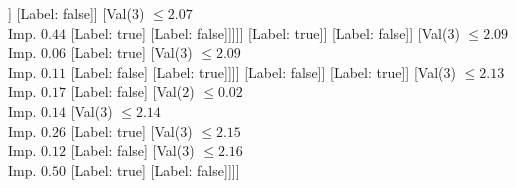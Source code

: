 \documentclass[margin=10pt]{standalone}
\begin{document}
\begin{forest}
										[Val($3$) $ \leq 2.16$ \\ Imp. $0.04$
											[Val($3$) $ \leq 2.16$ \\ Imp. $0.02$
												[Val($3$) $ \leq 2.11$ \\ Imp. $0.02$
													[Val($3$) $ \leq 2.10$ \\ Imp. $0.06$
														[Val($3$) $ \leq 2.09$ \\ Imp. $0.07$
															[Val($3$) $ \leq 2.09$ \\ Imp. $0.05$
																[Val($3$) $ \leq 2.07$ \\ Imp. $0.14$
																	[Val($3$) $ \leq 2.07$ \\ Imp. $0.09$
																		[Val($3$) $ \leq 2.03$ \\ Imp. $0.06$
																			[Label: false]
																			[Val($3$) $ \leq 2.04$ \\ Imp. $0.11$
																				[Label: true]
																				[Val($3$) $ \leq 2.06$ \\ Imp. $0.09$
																					[Val($3$) $ \leq 2.04$ \\ Imp. $0.12$
																						[Val($3$) $ \leq 2.04$ \\ Imp. $0.50$
																							[Label: false]
																							[Label: true]]
																						[Label: false]]
																					[Val($3$) $ \leq 2.07$ \\ Imp. $0.44$
																						[Label: true]
																						[Label: false]]]]]
																		[Label: true]]
																	[Label: false]]
																[Val($3$) $ \leq 2.09$ \\ Imp. $0.06$
																	[Label: true]
																	[Val($3$) $ \leq 2.09$ \\ Imp. $0.11$
																		[Label: false]
																		[Label: true]]]]
															[Label: false]]
														[Label: true]]
													[Val($3$) $ \leq 2.13$ \\ Imp. $0.17$
														[Label: false]
														[Val($2$) $ \leq 0.02$ \\ Imp. $0.14$
															[Val($3$) $ \leq 2.14$ \\ Imp. $0.26$
																[Label: true]
																[Val($3$) $ \leq 2.15$ \\ Imp. $0.12$
																	[Label: false]
																	[Val($3$) $ \leq 2.16$ \\ Imp. $0.50$
																		[Label: true]
																		[Label: false]]]]

\end{forest}
\end{document}
